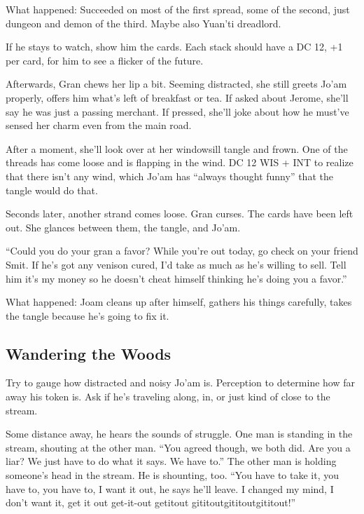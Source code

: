 \begin{multicols}{2}
\begin{aloud}
  What happened: Succeeded on most of the first spread, some of the second,
    just dungeon and demon of the third.  Maybe also Yuan'ti dreadlord.
  \end{aloud}

If he stays to watch, show him the cards.
Each stack should have a DC 12, +1 per card, for him to see a flicker of the future.

Afterwards, Gran chews her lip a bit.
Seeming distracted, she still greets Jo'am  properly, offers him what's left of breakfast or tea.
If asked about Jerome, she'll say he was just a passing merchant.
If pressed, she'll joke about how he must've sensed her charm even from the main road.

After a moment, she'll look over at her windowsill tangle and frown.
One of the threads has come loose and is flapping in the wind.
DC 12 WIS + INT to realize that there isn't any wind, which Jo'am has ``always thought funny''
that the tangle would do that.

Seconds later, another strand comes loose.
Gran curses.
The cards have been left out.
She glances between them, the tangle, and Jo'am.

``Could you do your gran a favor?
While you're out today, go check on your friend Smit.
If he's got any venison cured, I'd take as much as he's willing to sell.
Tell him it's my money so he doesn't cheat himself thinking he's doing you a favor.''

\begin{aloud}
What happened: Joam cleans up after himself, gathers his things carefully, takes the tangle
  because he's going to fix it.
\end{aloud}

\subsection{Wandering the Woods}

Try to gauge how distracted and noisy Jo'am is.
Perception to determine how far away his token is.
Ask if he's traveling along, in, or just kind of close to the stream.

Some distance away, he hears the sounds of struggle.
One man is standing in the stream, shouting at the other man.
``You agreed though, we both did.
  Are you a liar?
  We just have to do what it says.
  We have to.''
The other man is holding someone's head in the stream.
He is shounting, too.
``You have to take it, you have to, you have to, I want it out, he says he'll leave.
I changed my mind, I don't want it, get it out get-it-out getitout gititoutgititoutgititout!''


\end{multicols}
